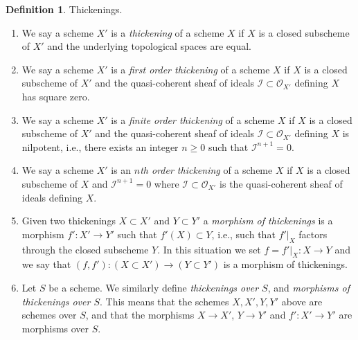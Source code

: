 \documentclass{amsart}
\theoremstyle{plain}
\theoremstyle{definition}
\newtheorem{definition}[subsection]{Definition}
\theoremstyle{remark}
\numberwithin{equation}{subsection}
\begin{document}
\begin{definition}
\label{definition-thickening}
Thickenings.
\begin{enumerate}
\item We say a scheme $X'$ is a {\it thickening} of a scheme $X$ if
$X$ is a closed subscheme of $X'$ and the underlying topological spaces
are equal.
\item We say a scheme $X'$ is a {\it first order thickening} of a scheme $X$ if
$X$ is a closed subscheme of $X'$ and the quasi-coherent sheaf of ideals
$\mathcal{I} \subset \mathcal{O}_{X'}$ defining $X$ has square zero.
\item We say a scheme $X'$ is a {\it finite order thickening} of a scheme $X$
if $X$ is a closed subscheme of $X'$ and the quasi-coherent sheaf of ideals
$\mathcal{I} \subset \mathcal{O}_{X'}$ defining $X$ is nilpotent, i.e.,
there exists an integer $n \geq 0$ such that $\mathcal{I}^{n + 1} = 0$.
\item We say a scheme $X'$ is an {\it $n$th order thickening} of a scheme $X$
if $X$ is a closed subscheme of $X$ and $\mathcal{I}^{n + 1} = 0$
where $\mathcal{I} \subset \mathcal{O}_{X'}$ is the
quasi-coherent sheaf of ideals defining $X$.
\item Given two thickenings $X \subset X'$ and $Y \subset Y'$ a
{\it morphism of thickenings} is a morphism $f' : X' \to Y'$ such that
$f'(X) \subset Y$, i.e., such that $f'|_X$ factors through the closed
subscheme $Y$. In this situation we set $f = f'|_X : X \to Y$ and we say
that $(f, f') : (X \subset X') \to (Y \subset Y')$ is a morphism of
thickenings.
\item Let $S$ be a scheme. We similarly define {\it thickenings over $S$}, and
{\it morphisms of thickenings over $S$}. This means that the schemes
$X, X', Y, Y'$ above are schemes over $S$, and that the morphisms
$X \to X'$, $Y \to Y'$ and $f' : X' \to Y'$ are morphisms over $S$.
\end{enumerate}
\end{definition}
\end{document}
